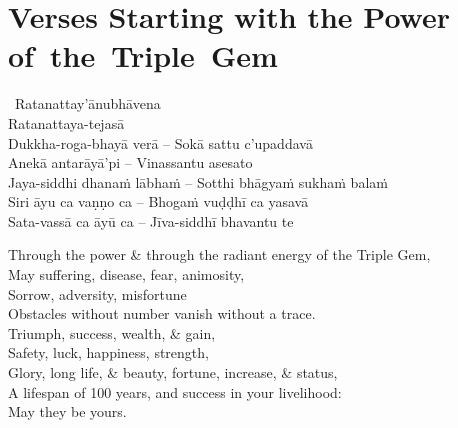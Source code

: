 \suttaRef{[Dhp 109]}

\clearpage



\section{Verses Starting with the Power \mbox{of}~the~Triple~Gem}
\label{power-of-the-triple-gem}

\begin{pali-hang-together}
  \anglebracketleft\ \hspace{-0.5mm}Ratanattay'ānubhāvena \hspace{-0.5mm}\anglebracketright\ \\
  Ratanattaya-tejasā\\
  Dukkha-roga-bhayā verā – Sokā sattu c'upaddavā\\
  Anekā antarāyā'pi – Vinassantu asesato\\
  Jaya-siddhi dhanaṁ lābhaṁ – Sotthi bhāgyaṁ sukhaṁ balaṁ\\
  Siri āyu ca vaṇṇo ca – Bhogaṁ vuḍḍhī ca yasavā\\
  Sata-vassā ca āyū ca – Jīva-siddhī bhavantu te
\end{pali-hang-together}

\begin{english-verses}
  Through the power \& through the radiant energy of the Triple Gem,\\
  May suffering, disease, fear, animosity,\\
  Sorrow, adversity, misfortune\\
  Obstacles without number vanish without a trace.\\
  Triumph, success, wealth, \& gain,\\
  Safety, luck, happiness, strength,\\
  Glory, long life, \& beauty, fortune, increase, \& status,\\
  A lifespan of 100 years, and success in your livelihood:\\
  May they be yours.
\end{english-verses}

\suttaRef{[Thai]}

\clearpage



